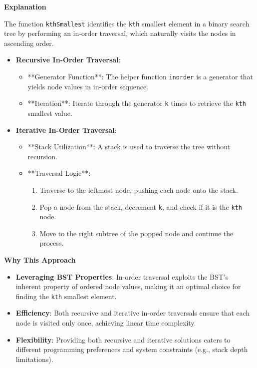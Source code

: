 \textbf{Explanation}

The function \texttt{kthSmallest} identifies the \texttt{kth} smallest element in a binary search tree by performing an in-order traversal, which naturally visits the nodes in ascending order.

\begin{itemize}
    \item \textbf{Recursive In-Order Traversal}:
    \begin{itemize}
        \item **Generator Function**: The helper function \texttt{inorder} is a generator that yields node values in in-order sequence.
        \item **Iteration**: Iterate through the generator \texttt{k} times to retrieve the \texttt{kth} smallest value.
    \end{itemize}
    
    \item \textbf{Iterative In-Order Traversal}:
    \begin{itemize}
        \item **Stack Utilization**: A stack is used to traverse the tree without recursion.
        \item **Traversal Logic**:
        \begin{enumerate}
            \item Traverse to the leftmost node, pushing each node onto the stack.
            \item Pop a node from the stack, decrement \texttt{k}, and check if it is the \texttt{kth} node.
            \item Move to the right subtree of the popped node and continue the process.
        \end{enumerate}
    \end{itemize}
\end{itemize}

\textbf{Why This Approach}

\begin{itemize}
    \item \textbf{Leveraging BST Properties}: In-order traversal exploits the BST's inherent property of ordered node values, making it an optimal choice for finding the \texttt{kth} smallest element.
    \item \textbf{Efficiency}: Both recursive and iterative in-order traversals ensure that each node is visited only once, achieving linear time complexity.
    \item \textbf{Flexibility}: Providing both recursive and iterative solutions caters to different programming preferences and system constraints (e.g., stack depth limitations).
\end{itemize}

